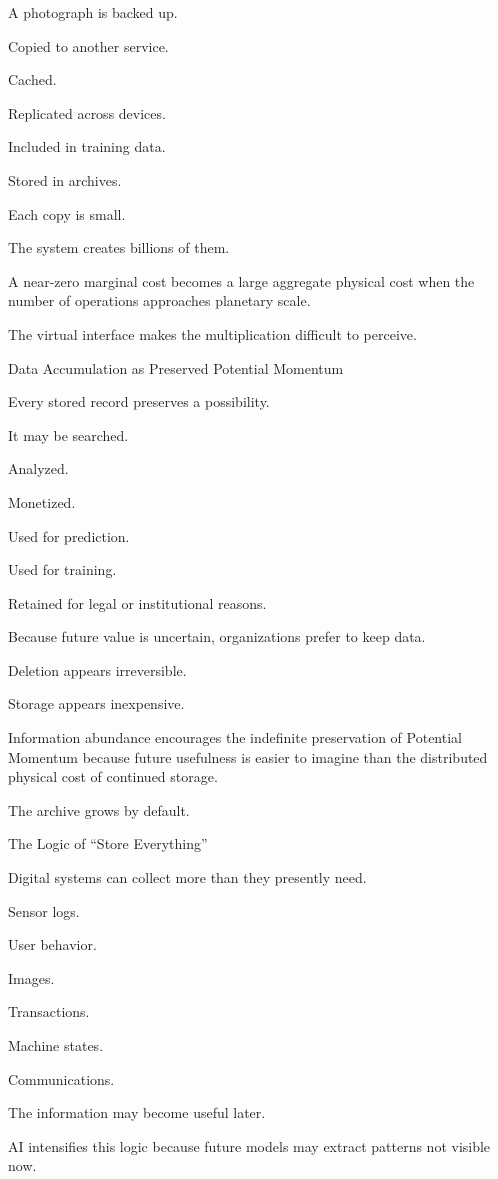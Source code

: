 A photograph is backed up.

Copied to another service.

Cached.

Replicated across devices.

Included in training data.

Stored in archives.

Each copy is small.

The system creates billions of them.

A near-zero marginal cost becomes a large aggregate physical cost when the number of operations approaches planetary scale.

The virtual interface makes the multiplication difficult to perceive.

Data Accumulation as Preserved Potential Momentum

Every stored record preserves a possibility.

It may be searched.

Analyzed.

Monetized.

Used for prediction.

Used for training.

Retained for legal or institutional reasons.

Because future value is uncertain, organizations prefer to keep data.

Deletion appears irreversible.

Storage appears inexpensive.

Information abundance encourages the indefinite preservation of Potential Momentum because future usefulness is easier to imagine than the distributed physical cost of continued storage.

The archive grows by default.

The Logic of “Store Everything”

Digital systems can collect more than they presently need.

Sensor logs.

User behavior.

Images.

Transactions.

Machine states.

Communications.

The information may become useful later.

AI intensifies this logic because future models may extract patterns not visible now.

